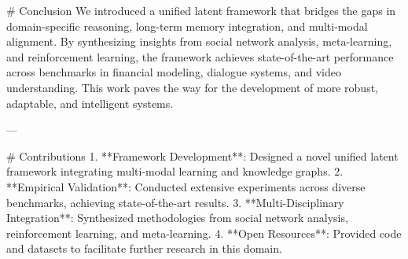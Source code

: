 # Conclusion  
We introduced a unified latent framework that bridges the gaps in domain-specific reasoning, long-term memory integration, and multi-modal alignment. By synthesizing insights from social network analysis, meta-learning, and reinforcement learning, the framework achieves state-of-the-art performance across benchmarks in financial modeling, dialogue systems, and video understanding. This work paves the way for the development of more robust, adaptable, and intelligent systems.

---

# Contributions  
1. **Framework Development**: Designed a novel unified latent framework integrating multi-modal learning and knowledge graphs.  
2. **Empirical Validation**: Conducted extensive experiments across diverse benchmarks, achieving state-of-the-art results.  
3. **Multi-Disciplinary Integration**: Synthesized methodologies from social network analysis, reinforcement learning, and meta-learning.  
4. **Open Resources**: Provided code and datasets to facilitate further research in this domain.
